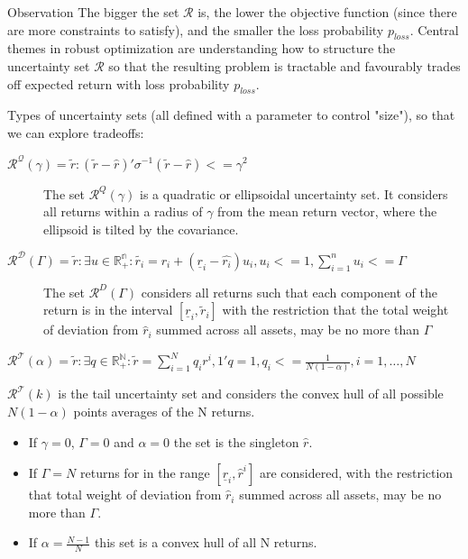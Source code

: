 \documentclass{beamer}
\begin{document}
\begin{frame}{}
\begin{block}{Observation}
The bigger the set $\mathcal{R}$ is, the lower the objective function (since there are more constraints to satisfy), and the smaller the loss probability $p_{loss}$. Central themes in robust optimization are understanding how to structure the uncertainty set $\mathcal{R}$ so that the resulting problem is tractable and favourably trades off expected return with loss probability $p_{loss}$.
\end{block}

Types of uncertainty sets (all defined with a parameter to control "size"), so that we can explore tradeoffs:
\begin{description}
\item[$\mathcal{R^Q}(\gamma) = {\tilde{r} : (\tilde{r} - \hat{r})'\sigma^{-1}(\tilde{r} - \hat{r}) <= \gamma^{2}}$] The set $\mathcal{R}^Q(\gamma)$ is a quadratic or ellipsoidal uncertainty set. It considers all returns within a radius of $\gamma$ from the mean return vector, where the ellipsoid is tilted by the covariance.   
\item[$\mathcal{R^D}(\Gamma) = {\tilde{r} : \exists u \in \mathbb{R_{+}^{n}} : \tilde{r_i} = \hat{r_i} + (\underline{r}_i - \hat{r_i})u_i, u_i <= 1, \sum_{i=1}^{n}u_i <= \Gamma}$] The set $\mathcal{R}^D(\Gamma)$ considers all returns such that each component of the return is in the interval $[\underline{r}_i,\tilde{r}_i]$ with the restriction that the total weight of deviation from $\hat{r}_i$ summed across all assets, may be no more than $\Gamma$
\item[$\mathcal{R^T}(\alpha) = {\tilde{r} : \exists q \in \mathbb{R_{+}^{N}} : \tilde{r} = \sum_{i=1}^{N}q_ir^i, 1'q = 1, q_i <= \frac{1}{N(1 - \alpha)}, i=1,\dots,N}$]
\end{description}
$\mathcal{R^T}(k)$ is the tail uncertainty set and considers the convex hull of all possible $N(1-\alpha)$ points averages of the N returns.
\end{frame}

\begin{frame}{}
\begin{itemize}
\item If $\gamma = 0$, $\Gamma = 0$ and $\alpha = 0$ the set is the singleton ${\hat{r}}$.
\item If $\Gamma = N$ returns for in the range $[\underline{r}_i, \hat{r}^i]$ are considered, with the restriction that total weight of deviation from $\hat{r}_i$ summed across all assets, may be no more than $\Gamma$.
\item If $\alpha = \frac{N-1}{N}$ this set is a convex hull of all N returns.
\end{itemize}
\end{frame}
\end{document}

